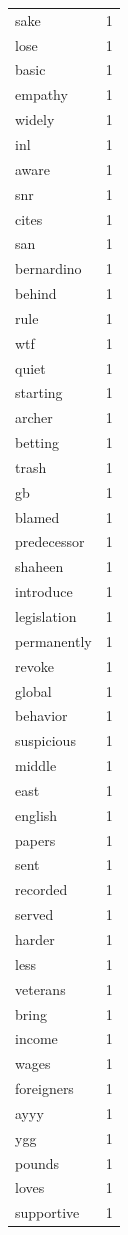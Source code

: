 \begin{tabular}{lr}
sake & 1 \\
lose & 1 \\
basic & 1 \\
empathy & 1 \\
widely & 1 \\
inl & 1 \\
aware & 1 \\
snr & 1 \\
cites & 1 \\
san & 1 \\
bernardino & 1 \\
behind & 1 \\
rule & 1 \\
wtf & 1 \\
quiet & 1 \\
starting & 1 \\
archer & 1 \\
betting & 1 \\
trash & 1 \\
gb & 1 \\
blamed & 1 \\
predecessor & 1 \\
shaheen & 1 \\
introduce & 1 \\
legislation & 1 \\
permanently & 1 \\
revoke & 1 \\
global & 1 \\
behavior & 1 \\
suspicious & 1 \\
middle & 1 \\
east & 1 \\
english & 1 \\
papers & 1 \\
sent & 1 \\
recorded & 1 \\
served & 1 \\
harder & 1 \\
less & 1 \\
veterans & 1 \\
bring & 1 \\
income & 1 \\
wages & 1 \\
foreigners & 1 \\
ayyy & 1 \\
ygg & 1 \\
pounds & 1 \\
loves & 1 \\
supportive & 1 \\

\end{tabular}
